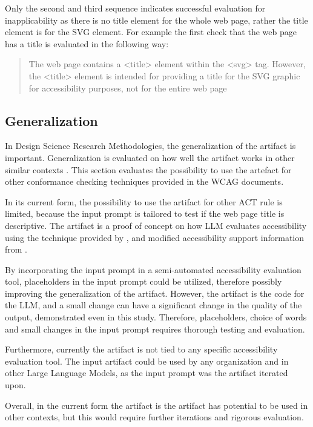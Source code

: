 Only the second and third sequence indicates successful evaluation for inapplicability as there is no title element for the whole web page, rather the title element is for the SVG element. For example the first check that the web page has a title is evaluated in the following way: \blockquote{The web page contains a <title> element within the <svg> tag. However, the <title> element is intended for providing a title for the SVG graphic for accessibility purposes, not for the entire web page}.


\subsection{Generalization}

In Design Science Research Methodologies, the generalization of the artifact is important. Generalization is evaluated on how well the artifact works in other similar contexts \citep{design_science_eval}. This section evaluates the possibility to use the artefact for other conformance checking techniques provided in the WCAG documents.

In its current form, the possibility to use the artifact for other ACT rule is limited, because the input prompt is  tailored to test if the web page title is descriptive. The artifact is a proof of concept on how LLM evaluates accessibility using the technique provided by \textcite{g88}, and modified accessibility support information from \textcite{act_rule_g88}. 

By incorporating the input prompt in a semi-automated accessibility evaluation tool, placeholders in the input prompt could be utilized, therefore possibly improving the generalization of the artifact. However, the artifact is the code for the LLM, and a small change can have a significant change in the quality of the output, demonstrated even in this study. Therefore, placeholders, choice of words and small changes in the input prompt requires thorough testing and evaluation.

Furthermore, currently the artifact is not tied to any specific accessibility evaluation tool. The input artifact could be used by any organization and in other Large Language Models, as the input prompt was the artifact iterated upon.

Overall, in the current form the artifact is the artifact has potential to be used in other contexts, but this would require further iterations and rigorous evaluation.

